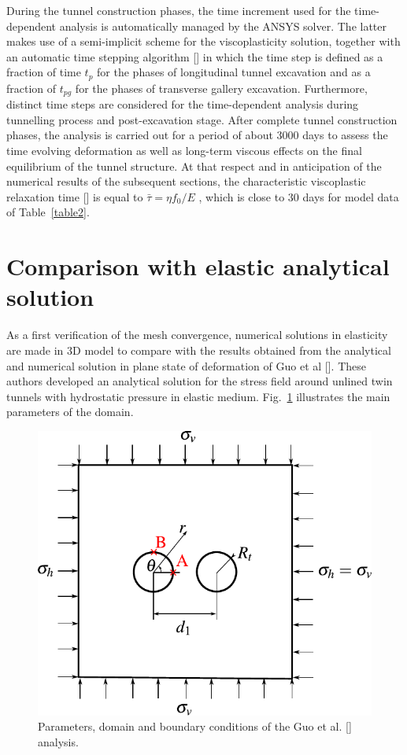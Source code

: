 \documentclass[a4paper,fleqn]{cas-sc}
\begin{document}
\FloatBarrier
During the tunnel construction phases, the time increment used for the time-dependent analysis is automatically managed by the ANSYS solver. The latter makes use of a semi-implicit scheme for the viscoplasticity solution, together with an automatic time stepping algorithm [] in which the time step is defined as a fraction of time $t_p$ for the phases of longitudinal tunnel excavation and as a fraction of $t_{pg}$ for the phases of transverse gallery excavation. Furthermore, distinct time steps are considered for the time-dependent analysis during tunnelling process and post-excavation stage. After complete tunnel construction phases, the analysis is carried out for a period of about $3000$ days to assess the time evolving deformation as well as long-term viscous effects on the final equilibrium of the tunnel structure. At that respect and in anticipation of the numerical results of the subsequent sections, the characteristic viscoplastic relaxation time [] is equal to $\bar{\tau} = \eta f_0 / E$ , which is close to $30$ days for model data of Table~\ref{table2}.

\section{Comparison with elastic analytical solution}\label{}


As a first verification of the mesh convergence, numerical solutions in elasticity are made in 3D model to compare with the results obtained from the analytical and numerical solution in plane state of deformation of Guo et al []. These authors developed an analytical solution for the stress field around unlined twin tunnels with hydrostatic pressure in elastic medium. Fig.~\ref{GUO_FIG0} illustrates the main parameters of the domain.
\begin{figure}[h!]
	\centering
	\includegraphics[scale=1]{GUO_FIG0.pdf}
	\caption{Parameters, domain and boundary conditions of the Guo et al. [] analysis.}
	\label{GUO_FIG0}
\end{figure}
\end{document}
